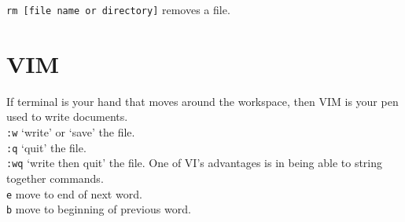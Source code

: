 \documentclass{article}[12pt]
\begin{document}
\verb|rm [file name or directory]| \hspace{1in} removes a file.\\

\section{VIM}
If terminal is your hand that moves around the workspace, then VIM is your pen used to write documents.\\

\verb|:w| \hspace{1in} `write' or `save' the file.\\

\verb|:q| \hspace{1in} `quit' the file.\\

\verb|:wq| \hspace{1in} `write then quit' the file. One of VI's advantages is in being able to string together commands.\\

\verb|e| \hspace{1in} move to end of next word.\\

\verb|b| \hspace{1in} move to beginning of previous word.\\
\end{document}
